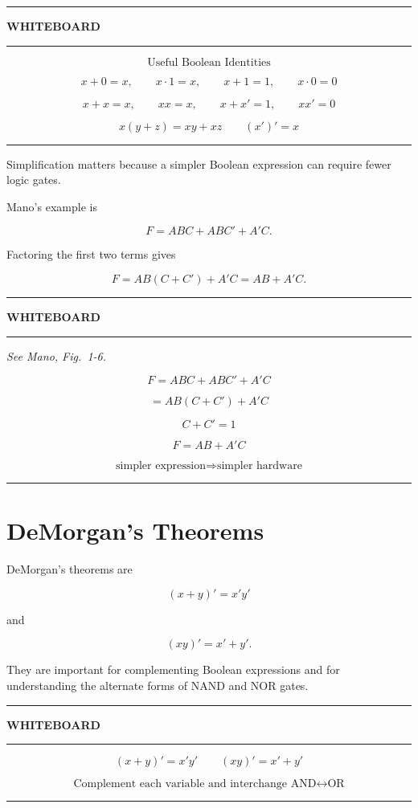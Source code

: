 \documentclass[11pt]{article}
\newenvironment{whiteboard}
{
    \par\medskip
    \hrule
    \vspace{0.35em}
    \noindent\textbf{\large WHITEBOARD}
    \par\vspace{0.3em}
    \hrule
    \vspace{0.65em}
}
{
    \vspace{0.45em}
    \hrule
    \par\medskip
}
\newcommand{\seeMano}[1]{%
    \textit{See Mano, Fig.~#1.}\par\smallskip
}
\begin{document}
\begin{whiteboard}

\[
\boxed{\text{Useful Boolean Identities}}
\]

\[
x+0=x,
\qquad
x\cdot1=x,
\qquad
x+1=1,
\qquad
x\cdot0=0
\]

\[
x+x=x,
\qquad
xx=x,
\qquad
x+x'=1,
\qquad
xx'=0
\]

\[
x(y+z)=xy+xz
\qquad
(x')'=x
\]

\end{whiteboard}

Simplification matters because a simpler Boolean expression can require fewer
logic gates.

Mano's example is

\[
F=ABC+ABC'+A'C.
\]

Factoring the first two terms gives

\[
F
=
AB(C+C')+A'C
=
AB+A'C.
\]

\begin{whiteboard}

\seeMano{1-6}

\[
F=ABC+ABC'+A'C
\]

\[
=AB(C+C')+A'C
\]

\[
C+C'=1
\]

\[
\boxed{F=AB+A'C}
\]

\[
\boxed{
\text{simpler expression}
\Rightarrow
\text{simpler hardware}
}
\]

\end{whiteboard}

\section{DeMorgan's Theorems}

DeMorgan's theorems are

\[
(x+y)'=x'y'
\]

and

\[
(xy)'=x'+y'.
\]

They are important for complementing Boolean expressions and for
understanding the alternate forms of NAND and NOR gates.

\begin{whiteboard}

\[
\boxed{(x+y)'=x'y'}
\qquad
\boxed{(xy)'=x'+y'}
\]

\[
\boxed{
\text{Complement each variable and interchange AND}
\leftrightarrow
\text{OR}
}
\]

\end{whiteboard}
\end{document}
